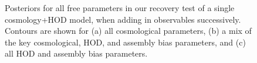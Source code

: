 \begin{figure}[p!]%
\renewcommand\thefigure{\arabic{chapter}.\arabic{figure}a--b}
\centering
{}
\vspace{1em}
\caption{Posteriors for all free parameters in our recovery test of a single cosmology+HOD model, when adding in observables successively. Contours are shown for (a) all cosmological parameters, (b) a mix of the key cosmological, HOD, and assembly bias parameters, and (c) all HOD and assembly bias parameters.}
\end{figure}

